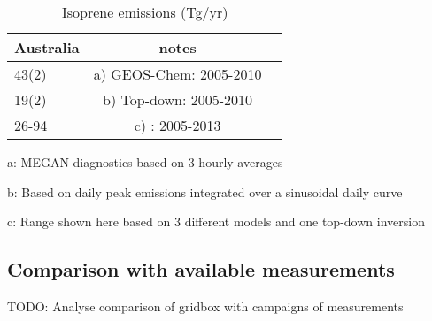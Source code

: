     
    
    
    \begin{table}\begin{threeparttable}
      \caption{Isoprene emissions (Tg/yr)}
      \begin{tabular}{ l  c  >{\arraybackslash}p{10cm} } 
        \toprule
        Australia & notes \\
        \midrule
        43(2) & a) GEOS-Chem: 2005-2010 \\ %
        19(2) & b) Top-down: 2005-2010 \\
        26-94 & c) \textcite{Bauwens2016}: 2005-2013\\
        \bottomrule
      \end{tabular}
      \begin{tablenotes} 
        \item a: MEGAN diagnostics based on 3-hourly averages
        \item b: Based on daily peak emissions integrated over a sinusoidal daily curve
        \item c: Range shown here based on 3 different models and one top-down inversion
      \end{tablenotes}
      \label{BioIsop:results:emissions:tab_emissions_Tg}
    \end{threeparttable}\end{table}
  
  \subsection{Comparison with available measurements}
    \label{BioIsop:results:measurements}
    TODO: %
    Analyse comparison of gridbox with campaigns of measurements
    
